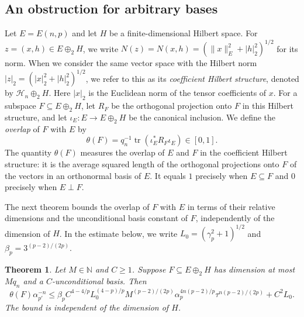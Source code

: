 \documentclass[11pt,a4paper,reqno]{amsart}
\newtheorem{theorem}{Theorem}[section]
\theoremstyle{definition}
\newcommand{\N}{\mathbb N}
\newcommand{\norm}[1]{\lVert #1\rVert}
\DeclareMathOperator{\tr}{tr}
\numberwithin{equation}{section}
\begin{document}
\subsection{An obstruction for arbitrary bases}\label{sec:overlap}

Let $E=E(n,p)$ and let $H$ be a finite-dimensional Hilbert space. For $z=(x,h)\in E\oplus_2H$, we write $N(z)=N(x,h)=(\norm x_E^2+|h|_2^2)^{1/2}$ for its norm. When we consider the same vector space with the Hilbert norm $|z|_2=(|x|_2^2+|h|_2^2)^{1/2}$, we refer to this as its \emph{coefficient Hilbert structure}, denoted by $\mathcal H_n\oplus_2H$. Here $|x|_2$ is the Euclidean norm of the tensor coefficients of $x$. For a subspace $F\subseteq E\oplus_2H$, let $R_F$ be the orthogonal projection onto $F$ in this Hilbert structure, and let $\iota_E\colon E\to E\oplus_2H$ be the canonical inclusion. We define the \emph{overlap} of $F$ with $E$ by
\begin{equation}\label{eq:overlap-definition}
 \theta(F)=q_n^{-1}\tr(\iota_E^*R_F\iota_E)\in[0,1].
\end{equation}
The quantity $\theta(F)$ measures the overlap of $E$ and $F$ in the coefficient Hilbert structure: it is the average squared length of the orthogonal projections onto $F$ of the vectors in an orthonormal basis of $E$. It equals $1$ precisely when $E\subseteq F$ and $0$ precisely when $E\perp F$.

The next theorem bounds the overlap of $F$ with $E$ in terms of their relative dimensions and the unconditional basis constant of $F$, independently of the dimension of $H$. In the estimate below, we write $L_0=(\gamma_p^2+1)^{1/2}$ and $\beta_p=3^{(p-2)/(2p)}$.

\begin{theorem}\label{thm:overlap}
Let $M\in\N$ and $C\geq1$. Suppose $F\subseteq E\oplus_2H$ has dimension at most $Mq_n$ and a $C$-unconditional basis. Then
\begin{equation*}
 \theta(F)\alpha_{p'}^{-n}
 \leq\beta_p C^{4-4/p}L_0^{(4-p)/p}M^{(p-2)/(2p)}
       \alpha_p^{4n(p-2)/p}\tau^{n(p-2)/(2p)} +C^2L_0.
\end{equation*}
The bound is independent of the dimension of $H$.
\end{theorem}
\end{document}
